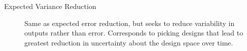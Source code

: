 \documentclass{sig-alternate}
\begin{document}
\begin{description}
\item[Expected Variance Reduction] Same as expected error reduction, but seeks to reduce variability in outputs rather than error.
Corresponds to picking designs that lead to greatest reduction in uncertainty about the design space over time.
\end{description}




\end{document}
